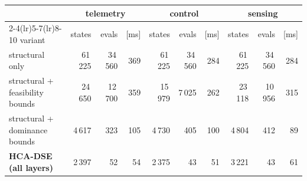 \scriptsize
\setlength{\tabcolsep}{3.5pt}
\begin{tabular}{lrrrrrrrrr}
\toprule
& \multicolumn{3}{c}{telemetry} & \multicolumn{3}{c}{control} & \multicolumn{3}{c}{sensing} \\
\cmidrule(lr){2-4}\cmidrule(lr){5-7}\cmidrule(lr){8-10}
variant & states & evals & [ms] & states & evals & [ms] & states & evals & [ms] \\
\midrule
structural only & 61\,225 & 34\,560 & 369 & 61\,225 & 34\,560 & 284 & 61\,225 & 34\,560 & 284 \\
structural + feasibility bounds & 24\,650 & 12\,700 & 359 & 15\,979 & 7\,025 & 262 & 23\,118 & 10\,956 & 315 \\
structural + dominance bounds & 4\,617 & 323 & 105 & 4\,730 & 405 & 100 & 4\,804 & 412 & 89 \\
\textbf{HCA-DSE (all layers)} & 2\,397 & 52 & 54 & 2\,375 & 43 & 51 & 3\,221 & 43 & 61 \\
\bottomrule
\end{tabular}
